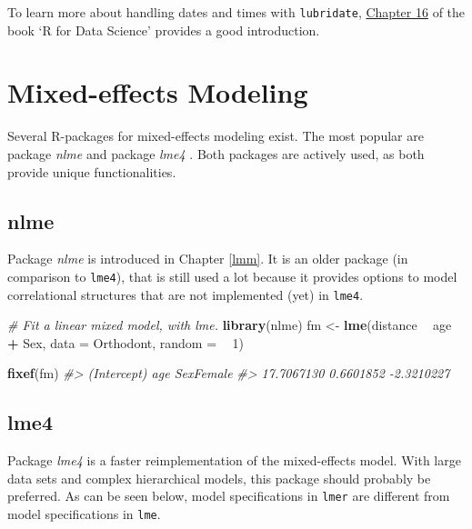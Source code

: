 \documentclass[]{book}
\newenvironment{Shaded}{\begin{snugshade}}{\end{snugshade}}
\newcommand{\KeywordTok}[1]{\textcolor[rgb]{0.13,0.29,0.53}{\textbf{#1}}}
\newcommand{\DataTypeTok}[1]{\textcolor[rgb]{0.13,0.29,0.53}{#1}}
\newcommand{\DecValTok}[1]{\textcolor[rgb]{0.00,0.00,0.81}{#1}}
\newcommand{\StringTok}[1]{\textcolor[rgb]{0.31,0.60,0.02}{#1}}
\newcommand{\CommentTok}[1]{\textcolor[rgb]{0.56,0.35,0.01}{\textit{#1}}}
\newcommand{\OperatorTok}[1]{\textcolor[rgb]{0.81,0.36,0.00}{\textbf{#1}}}
\newcommand{\NormalTok}[1]{#1}
\begin{document}
To learn more about handling dates and times with \texttt{lubridate},
\href{http://r4ds.had.co.nz/dates-and-times.html}{Chapter 16} of the
book `R for Data Science' \citep{wickham2016r} provides a good
introduction.

\section{Mixed-effects Modeling}\label{mixed-effects-modeling}


Several R-packages for mixed-effects modeling exist. The most popular
are package \emph{nlme} \citep{R-nlme} and package \emph{lme4}
\citep{Bates2015}. Both packages are actively used, as both provide
unique functionalities.

\subsection{nlme}\label{nlme}


Package \emph{nlme} is introduced in Chapter \ref{lmm}. It is an older
package (in comparison to \texttt{lme4}), that is still used a lot
because it provides options to model correlational structures that are
not implemented (yet) in \texttt{lme4}.

\begin{Shaded}
\begin{Highlighting}[]
\CommentTok{# Fit a linear mixed model, with lme.}
\KeywordTok{library}\NormalTok{(nlme)}
\NormalTok{fm <-}\StringTok{ }\KeywordTok{lme}\NormalTok{(distance }\OperatorTok{~}\StringTok{ }\NormalTok{age }\OperatorTok{+}\StringTok{ }\NormalTok{Sex, }\DataTypeTok{data =}\NormalTok{ Orthodont, }\DataTypeTok{random =} \OperatorTok{~}\StringTok{ }\DecValTok{1}\NormalTok{)}

\KeywordTok{fixef}\NormalTok{(fm)}
\CommentTok{#> (Intercept)         age   SexFemale }
\CommentTok{#>  17.7067130   0.6601852  -2.3210227}
\end{Highlighting}
\end{Shaded}

\subsection{lme4}\label{lme4}


Package \emph{lme4} \citep{Bates2015} is a faster reimplementation of
the mixed-effects model. With large data sets and complex hierarchical
models, this package should probably be preferred. As can be seen below,
model specifications in \texttt{lmer} are different from model
specifications in \texttt{lme}.
\end{document}
